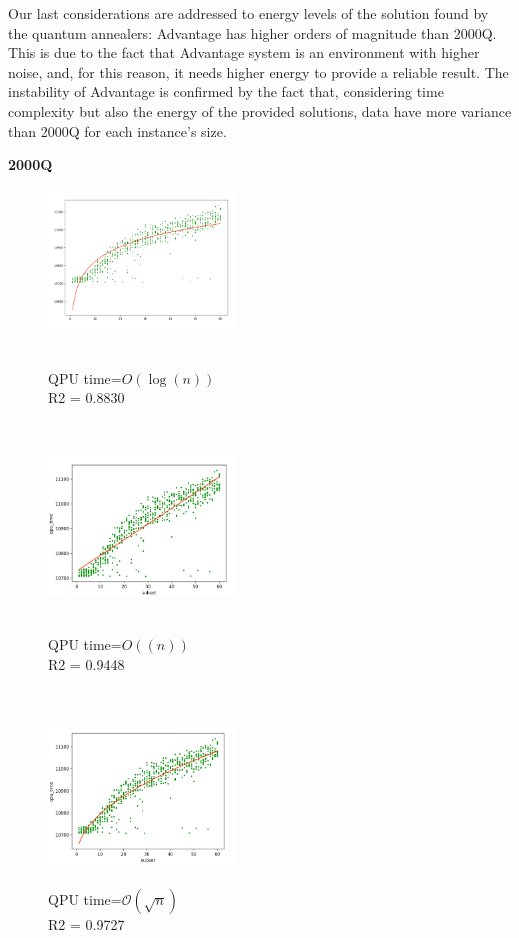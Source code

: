 \documentclass[oneside,a4paper]{article}
\begin{document}
Our last considerations are addressed to energy levels of the solution found by the quantum annealers: Advantage has higher orders of magnitude than 2000Q. This is due to the fact that Advantage system is an environment with higher noise, and, for this reason, it needs higher energy to provide a reliable result. The instability of Advantage is confirmed by the fact that, considering time complexity but also the energy of the provided solutions, data have more variance than 2000Q for each instance's size.


\textbf{2000Q}

\begin{figure}[htp]
\begin{minipage}[b]{4.5cm}
\includegraphics[width=5cm]{LaTeXTemplate/Images/2000QpossibleFitting1.png}
\caption{\\QPU time=$O(\log(n))$\\
R2 = 0.8830\\
}
\end{minipage}
\ \hspace{2mm} \hspace{2mm} \
\begin{minipage}[b]{5cm}
\includegraphics[width=5cm]{LaTeXTemplate/Images/2000QpossibleFitting2.png}
\caption{\\QPU time=$O((n))$\\
R2 = 0.9448\\}
\end{minipage}
\ \hspace{2mm} \hspace{2mm} \
\begin{minipage}[b]{4.5cm}
\centering
\includegraphics[width=5cm]{LaTeXTemplate/Images/2000QpossibleFitting3.png}
\caption{\\QPU time=$\mathcal{O}(\sqrt{n})$\\
{\color{ForestGreen}R2 = 0.9727\\}}
\end{minipage}
\end{figure}
\end{document}

